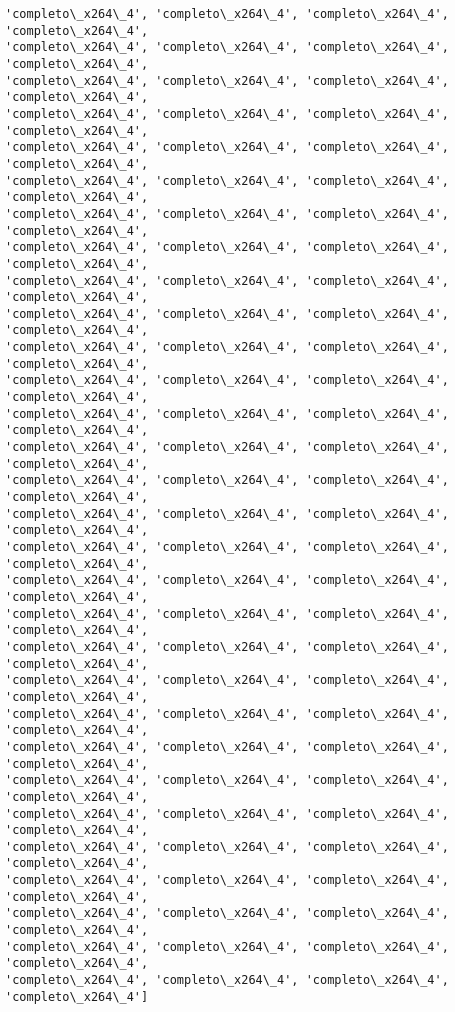 \documentclass[11pt]{article}
\begin{document}
\begin{Verbatim}[commandchars=\\\{\}]
'completo\_x264\_4', 'completo\_x264\_4', 'completo\_x264\_4', 'completo\_x264\_4',
'completo\_x264\_4', 'completo\_x264\_4', 'completo\_x264\_4', 'completo\_x264\_4',
'completo\_x264\_4', 'completo\_x264\_4', 'completo\_x264\_4', 'completo\_x264\_4',
'completo\_x264\_4', 'completo\_x264\_4', 'completo\_x264\_4', 'completo\_x264\_4',
'completo\_x264\_4', 'completo\_x264\_4', 'completo\_x264\_4', 'completo\_x264\_4',
'completo\_x264\_4', 'completo\_x264\_4', 'completo\_x264\_4', 'completo\_x264\_4',
'completo\_x264\_4', 'completo\_x264\_4', 'completo\_x264\_4', 'completo\_x264\_4',
'completo\_x264\_4', 'completo\_x264\_4', 'completo\_x264\_4', 'completo\_x264\_4',
'completo\_x264\_4', 'completo\_x264\_4', 'completo\_x264\_4', 'completo\_x264\_4',
'completo\_x264\_4', 'completo\_x264\_4', 'completo\_x264\_4', 'completo\_x264\_4',
'completo\_x264\_4', 'completo\_x264\_4', 'completo\_x264\_4', 'completo\_x264\_4',
'completo\_x264\_4', 'completo\_x264\_4', 'completo\_x264\_4', 'completo\_x264\_4',
'completo\_x264\_4', 'completo\_x264\_4', 'completo\_x264\_4', 'completo\_x264\_4',
'completo\_x264\_4', 'completo\_x264\_4', 'completo\_x264\_4', 'completo\_x264\_4',
'completo\_x264\_4', 'completo\_x264\_4', 'completo\_x264\_4', 'completo\_x264\_4',
'completo\_x264\_4', 'completo\_x264\_4', 'completo\_x264\_4', 'completo\_x264\_4',
'completo\_x264\_4', 'completo\_x264\_4', 'completo\_x264\_4', 'completo\_x264\_4',
'completo\_x264\_4', 'completo\_x264\_4', 'completo\_x264\_4', 'completo\_x264\_4',
'completo\_x264\_4', 'completo\_x264\_4', 'completo\_x264\_4', 'completo\_x264\_4',
'completo\_x264\_4', 'completo\_x264\_4', 'completo\_x264\_4', 'completo\_x264\_4',
'completo\_x264\_4', 'completo\_x264\_4', 'completo\_x264\_4', 'completo\_x264\_4',
'completo\_x264\_4', 'completo\_x264\_4', 'completo\_x264\_4', 'completo\_x264\_4',
'completo\_x264\_4', 'completo\_x264\_4', 'completo\_x264\_4', 'completo\_x264\_4',
'completo\_x264\_4', 'completo\_x264\_4', 'completo\_x264\_4', 'completo\_x264\_4',
'completo\_x264\_4', 'completo\_x264\_4', 'completo\_x264\_4', 'completo\_x264\_4',
'completo\_x264\_4', 'completo\_x264\_4', 'completo\_x264\_4', 'completo\_x264\_4',
'completo\_x264\_4', 'completo\_x264\_4', 'completo\_x264\_4', 'completo\_x264\_4',
'completo\_x264\_4', 'completo\_x264\_4', 'completo\_x264\_4', 'completo\_x264\_4',
'completo\_x264\_4', 'completo\_x264\_4', 'completo\_x264\_4', 'completo\_x264\_4',
'completo\_x264\_4', 'completo\_x264\_4', 'completo\_x264\_4', 'completo\_x264\_4']
    \end{Verbatim}
\end{document}
